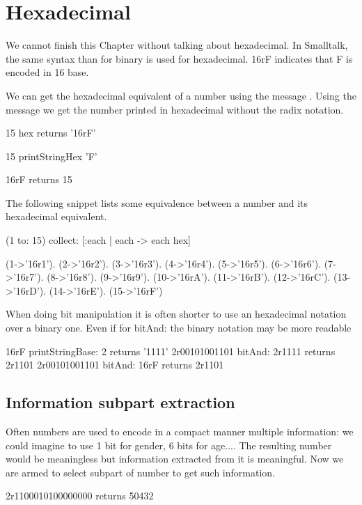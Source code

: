 \documentclass[a4paper,10pt,twoside]{book}
\begin{document}
\section{Hexadecimal}
We cannot finish this Chapter without talking about hexadecimal. In Smalltalk, the same syntax than for binary is used for hexadecimal. 16rF indicates that F is encoded in 16 base. 

We can get the hexadecimal equivalent of a number using the message . 
Using the message  we get the number printed in hexadecimal without the radix notation. 

\begin{code}
15 hex
	returns '16rF'
	
15 printStringHex 'F'

16rF
	returns 15
\end{code}

The following snippet lists some equivalence between a number and its hexadecimal equivalent.
\begin{code}
(1 to: 15) collect: [:each | each -> each hex] 

{(1->'16r1'). (2->'16r2'). (3->'16r3'). (4->'16r4'). (5->'16r5'). (6->'16r6'). (7->'16r7'). (8->'16r8'). (9->'16r9'). (10->'16rA'). (11->'16rB'). (12->'16rC'). (13->'16rD'). (14->'16rE'). (15->'16rF')}
\end{code}

When doing bit manipulation it is often shorter to use an hexadecimal notation over a binary one. Even if for bitAnd: the binary notation may be more readable
\begin{code}{}
16rF printStringBase: 2
	returns '1111'
2r00101001101 bitAnd: 2r1111	
	returns 2r1101
2r00101001101 bitAnd: 16rF
	returns 2r1101
\end{code}


\subsection*{Information subpart extraction}
Often numbers are used to encode in a compact manner multiple information: we could imagine to use 1 bit for gender, 6 bits for age.... The resulting number would be meaningless but information extracted from it is meaningful.
Now we are armed to select subpart of number to get such information. 

\begin{code}{}
2r1100010100000000 
	returns 50432
\end{code}
\end{document}

